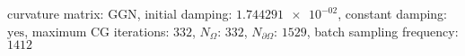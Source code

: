 curvature matrix: $\text{GGN}$, initial damping: $\num[scientific-notation=true]{1.744291e-02}$, constant damping: $\text{yes}$, maximum CG iterations: $\num[scientific-notation=false]{332}$, $N_{\Omega}$: $\num[scientific-notation=false]{332}$, $N_{\partial\Omega}$: $\num[scientific-notation=false]{1529}$, batch sampling frequency: $\num[scientific-notation=false]{1412}$